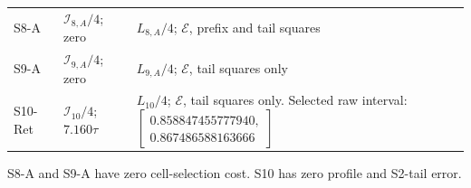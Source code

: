 \begin{lemma}
\begin{center}
\begin{tabularx}{\textwidth}{@{}lXX@{}}
S8-A & $\mathcal I_{8,A}/4$; zero & $L_{8,A}/4$; $\mathcal E$, prefix and tail squares\\
S9-A & $\mathcal I_{9,A}/4$; zero & $L_{9,A}/4$; $\mathcal E$, tail squares only\\
S10-Ret & $\mathcal I_{10}/4$; $7.160\tau$
 & $L_{10}/4$; $\mathcal E$, tail squares only.
 Selected raw interval:
 $\left[\begin{gathered}0.858847455777940,\\0.867486588163666\end{gathered}\right]$\\\bottomrule
\end{tabularx}
\end{center}
S8-A and S9-A have zero cell-selection cost.
S10 has zero profile and S2-tail error.
\end{lemma}
